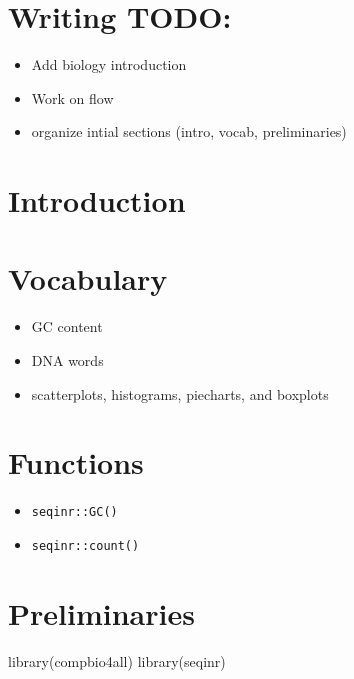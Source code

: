 \documentclass[
]{book}
\newenvironment{Shaded}{\begin{snugshade}}{\end{snugshade}}
\newcommand{\FunctionTok}[1]{\textcolor[rgb]{0.00,0.00,0.00}{#1}}
\newcommand{\NormalTok}[1]{#1}
\providecommand{\tightlist}{%
  \setlength{\itemsep}{0pt}\setlength{\parskip}{0pt}}
\begin{document}
\hypertarget{writing-todo}{%
\section{Writing TODO:}\label{writing-todo}}

\begin{itemize}
\tightlist
\item
  Add biology introduction
\item
  Work on flow
\item
  organize intial sections (intro, vocab, preliminaries)
\end{itemize}

\hypertarget{introduction}{%
\section{Introduction}\label{introduction}}

\hypertarget{vocabulary-1}{%
\section{Vocabulary}\label{vocabulary-1}}

\begin{itemize}
\tightlist
\item
  GC content
\item
  DNA words
\item
  scatterplots, histograms, piecharts, and boxplots
\end{itemize}

\hypertarget{functions}{%
\section{Functions}\label{functions}}

\begin{itemize}
\tightlist
\item
  \texttt{seqinr::GC()}
\item
  \texttt{seqinr::count()}
\end{itemize}

\hypertarget{preliminaries}{%
\section{Preliminaries}\label{preliminaries}}

\begin{Shaded}
\begin{Highlighting}[]
\FunctionTok{library}\NormalTok{(compbio4all)}
\FunctionTok{library}\NormalTok{(seqinr)}
\end{Highlighting}
\end{Shaded}
\end{document}

